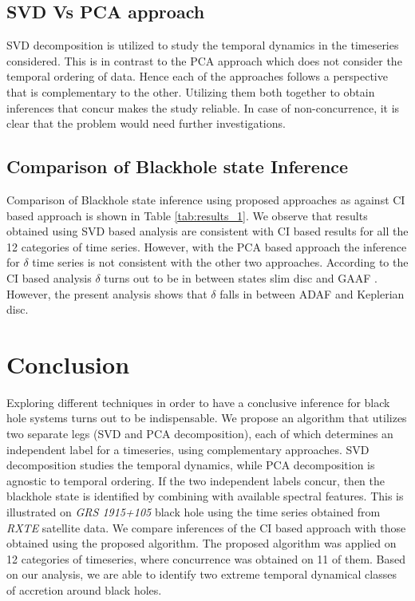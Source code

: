 \documentclass[journal]{IEEEtran}
\begin{document}
	\subsection {SVD Vs PCA approach} SVD decomposition is utilized to study the temporal dynamics in the timeseries considered. This is in contrast to the PCA approach which does not consider the temporal ordering of data. Hence each of the approaches follows a perspective that is complementary to the other. Utilizing them both together to obtain inferences that concur makes the study reliable. In case of non-concurrence, it is clear that the problem would need further investigations.

\subsection{Comparison of Blackhole state Inference}
Comparison of Blackhole state inference using proposed approaches as against CI based approach \cite{Adegoke2018} is shown in Table \ref{tab:results_1}. We observe that results obtained using SVD based analysis are consistent with CI based results for all the 12 categories of time series. However, with the PCA based approach the inference for  $\delta$ time series is not consistent with the other two approaches. According to the CI based analysis $\delta$ turns out to be in between states slim disc and GAAF \cite{Adegoke2018}. However, the present analysis shows that $\delta$ falls in between ADAF and Keplerian disc.
	
	\section{Conclusion}
	Exploring different techniques in order to have a conclusive inference for black hole systems turns out to be indispensable. We propose an algorithm that utilizes two separate legs (SVD and PCA decomposition), each of which determines an independent label for a timeseries, using complementary approaches. SVD decomposition studies the temporal dynamics, while PCA decomposition is agnostic to temporal ordering. If the two independent labels concur, then the blackhole state is identified by combining with available spectral features. This is illustrated on \textit{GRS 1915+105} black hole using the time series obtained from \textit{RXTE} satellite data. We compare inferences of the CI based approach with those obtained using the proposed algorithm. The proposed algorithm was applied on 12 categories of timeseries, where concurrence was obtained on 11 of them. Based on our analysis, we are able to identify two extreme temporal dynamical classes of accretion around black holes.
	
\end{document}
